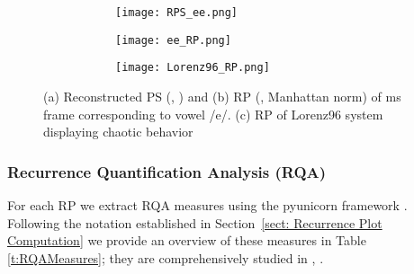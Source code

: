 \documentclass[a4paper]{article}
\begin{document}
\begin{figure}[ht]
        \centering
        \begin{subfigure}[ht]{\linewidth}
           \begin{subfigure}[h]{0.32\linewidth}
              \texttt{[image: RPS\_ee.png]}
              \caption{}
              \label{fig:RPS}
          \end{subfigure}
          \begin{subfigure}[h]{0.32\linewidth}
              \texttt{[image: ee\_RP.png]}
              \caption{}
              \label{fig:RP}
          \end{subfigure}
          \begin{subfigure}[h]{0.32\linewidth}
              \texttt{[image: Lorenz96\_RP.png]}
              \caption{}
              \label{fig:RPLorenz}
          \end{subfigure}
        \end{subfigure}
        \caption{(a) Reconstructed PS (, ) and (b) RP (, Manhattan norm) of ms frame corresponding to vowel /e/. (c) RP of Lorenz96 system displaying chaotic behavior \cite{Lorenz96}}
        \label{fig:RPS-RPvisualization}
        
\end{figure}



\subsubsection{Recurrence Quantification Analysis (RQA)}
\label{sect: RQA measures}
For each  RP we extract  RQA measures using the pyunicorn framework \cite{pyunicorn}. Following the notation established in Section~\ref{sect: Recurrence Plot Computation} we provide an overview of these measures in Table \ref{t:RQAMeasures}; they are comprehensively studied in \cite{marwan2007recurrenceAll}, \cite{RQAExtended2005}. 
\end{document}
